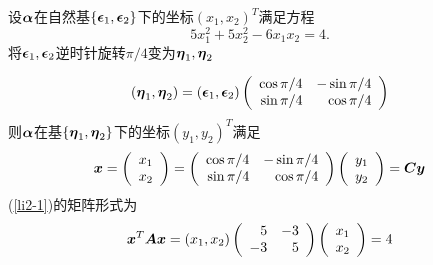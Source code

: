 \begin{frame}
  
    \begin{li}
      设$\boldsymbol{\alpha}$在自然基$\{\boldsymbol{\epsilon}_1,\boldsymbol{\epsilon}_2\}$下的坐标$(x_1,x_2)^T$满足方程
      \begin{equation}\label{li2-1}
        5x_1^2+5x_2^2-6x_1x_2=4.
      \end{equation}      
      将$\boldsymbol{\epsilon}_1,\boldsymbol{\epsilon}_2$逆时针旋转$\pi/4$变为$\boldsymbol{\eta}_1,\boldsymbol{\eta}_2$      
    \end{li}
    \pause 
    $$
    (\boldsymbol{\eta}_1,\boldsymbol{\eta}_2)=(\boldsymbol{\epsilon}_1,\boldsymbol{\epsilon}_2)\left(
    \begin{array}{rr}
      \cos \pi/4&-\sin \pi/4\\
      \sin\pi/4&\cos\pi/4
    \end{array}
    \right)
    $$
    则$\boldsymbol{\alpha}$在基$\{\boldsymbol{\eta}_1,\boldsymbol{\eta}_2\}$下的坐标$(y_1,y_2)^T$满足
    $$
    {\boldsymbol{x}}=\left(
    \begin{array}{c}
      x_1\\
      x_2
    \end{array}
    \right)=\left(
    \begin{array}{rr}
      \cos \pi/4&-\sin \pi/4\\
      \sin\pi/4&\cos\pi/4
    \end{array}
    \right)\left(
    \begin{array}{c}
      y_1\\
      y_2
    \end{array}
    \right)=\boldsymbol{C}{\boldsymbol{y}}
    $$\pause 
    (\ref{li2-1})的矩阵形式为
    $$
    {\boldsymbol{x}}^T\boldsymbol{A}{\boldsymbol{x}}=(x_1,x_2)\left(
    \begin{array}{rr}
      5&-3\\
      -3&5
    \end{array}
    \right)\left(
    \begin{array}{c}
      x_1\\
      x_2
    \end{array}
    \right)=4
    $$

  
\end{frame}


